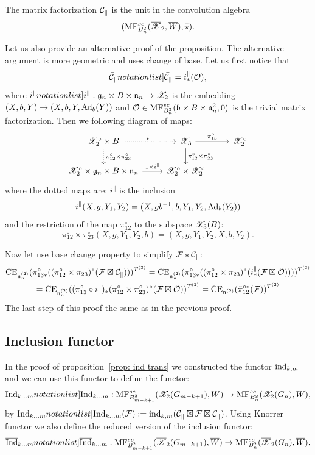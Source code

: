 \begin{corollary} The matrix factorization $\bar{\mathcal{C}}_{\parallel}$ is the unit in the convolution algebra $$(\mathrm{MF}^{sc}_{B_n^2}(\overline{\mathscr{X}}_2,\overline{W}),\bar{\star}).$$
\end{corollary}

Let us also provide an alternative proof of the proposition. The alternative argument is more geometric and uses  change of base. Let us first notice that
$$ \SymbolPrint{\bcalC_{\parallel}}=i_{*}^{\parallel}(\calO),$$
where $\SymbolPrint{i^{\parallel}}: \frg_n\times B\times \frn_n\to \calX_2$ is the embedding
$(X,b,Y)\to (X,b,Y,{\rm Ad}_b(Y))$ and $\mathcal{O}\in \mathrm{MF}^{sc}_{B_n^3}(\mathfrak{b}\times B\times \mathfrak{n}_n^2,0)$ is the trivial matrix
factorization.%
  Then we following diagram of maps:
  $$ \begin{tikzcd}
 \calX_2^{\circ}\times B \arrow[dotted]{r}{i^{\parallel}}\arrow[dotted]{d}{\pi_{12}^\circ\times\pi_{23}^\circ}   & \calX_3\arrow{d}{\pi_{12}^\circ\times\pi_{23}^\circ}\arrow{r}{\pi_{13}^{\circ}}&\calX^\circ_2\\
\calX_2^\circ\times \frg_n\times B\times \frn_n\arrow{r}{1\times i^{\parallel}} &                                  \calX^\circ_2\times\calX^\circ_2&
 \end{tikzcd}$$
 where the dotted maps are: $i^{\parallel}$ is the  inclusion  \[ i^{\parallel}(X,g,Y_1,Y_2)=(X,gb^{-1},b,Y_1,Y_2,{\rm Ad}_b(Y_2))\] and
 the restriction of the  map \(\pi_{12}^{\circ}\)
to the subspace $\mathscr{X}_3(B)$: \[\pi_{12}^\circ\times \pi_{23}^\circ(X,g,Y_1,Y_2,b)=(X,g,Y_1,Y_2,X,b,Y_2).\]

Now let use base change property to simplify \( \mathcal{F}\star\mathcal{C}_\parallel\):
\begin{multline*}
\mathrm{CE}_{\mathfrak{n}_n^{(2)}}(\pi_{13*}^{\circ}((\pi_{12}^{\circ}\times\pi_{23})^*(\mathcal{F}\boxtimes \mathcal{C}_\parallel)))^{T^{(2)}}=
\mathrm{CE}_{\mathfrak{n}_n^{(2)}}(\pi_{13*}^{\circ}((\pi_{12}^{\circ}\times\pi_{23})^*(i_*^\parallel(\mathcal{F}\boxtimes \mathcal{O}))))^{T^{(2)}}\\=
\mathrm{CE}_{\mathfrak{n}_n^{(2)}}((\pi_{13}^{\circ}\circ i^\parallel)_*(\pi_{12}^{\circ}\times\pi_{23}^\circ)^*(\mathcal{F}\boxtimes \mathcal{O}))^{T^{(2)}}=\mathrm{CE}_{\mathfrak{n}^{(2)}}(\tilde{\pi}_{12}^{\circ*}(\mathcal{F}))^{T^{(2)}}
\end{multline*}
The last step of this proof the same as in the previous proof.

\subsection{Inclusion functor}
In the proof of proposition~\ref{prop: ind trans} we constructed the functor $\mathrm{ind}_{k,m}$ and we can use this functor to define the functor:
$$\SymbolPrint{\Ind_{k\dots m}}: \MF_{ B_{m-k+1}^2}(\calX_2(G_{m-k+1}),W)\to \MF_{ B_n^2}(\calX_2(G_n),W),$$
by $\SymbolPrint{\Ind_{k\dots m}}(\calF):=\ind_{k,m}(\calC_{\parallel}\boxtimes\calF\boxtimes\calC_{\parallel})$.
Using Knorrer functor we also define the reduced version of the inclusion functor:
$$\SymbolPrint{\Indb_{k\dots m}}: \MF_{B_{m-k+1}^2}(\calXr_2(G_{m-k+1}),\Wr)\to \MF_{B_n^2}(\calXr_2(G_n),\Wr),$$


